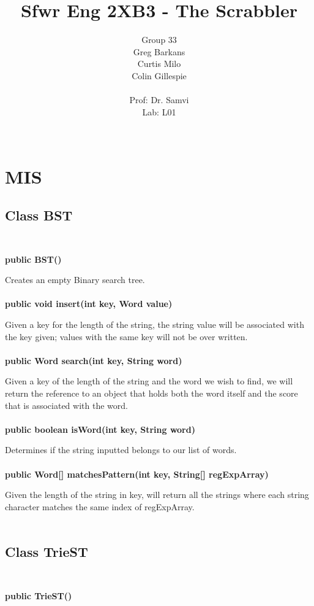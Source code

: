 \documentclass[11pt]{article}
\title{\vspace{4cm} 
	 Sfwr Eng 2XB3 - The Scrabbler}      %
\author{ 
	Group 33 \\       %
	Greg Barkans \\
	Curtis Milo \\
	Colin Gillespie \\
	 \vspace{1cm} \\
	Prof: Dr. Samvi \\
	Lab: L01 \\
	 \vspace{2cm} \\
}
\date{}
\begin{document}
\maketitle
\newpage
\tableofcontents
\newpage
\section{MIS \\}
\subsection{Class BST \\\\}
\textbf{public BST()\\}

Creates an empty Binary search tree.\\\\
\textbf{public void insert(int key, Word value) \\}

Given a key for the length of the string,  the string value will be associated with the key given;  values with the same key will not be over written.\\\\
%
\textbf{public Word search(int key, String word)\\}

Given a key of the length of the string and the word we wish to find, we will return the reference to an object that holds both the word itself and the score that is associated with the word.\\\\
%
\textbf{public  boolean isWord(int key, String word)\\}

Determines if the string inputted belongs to our list of words.\\\\
%
\textbf{public Word[] matchesPattern(int key, String[] regExpArray)\\}

Given the length of the string in key, will return all the strings where each string character matches the same index of regExpArray.\\\\
%
\subsection{Class TrieST \\\\}
\textbf{public TrieST()\\}
\end{document}
